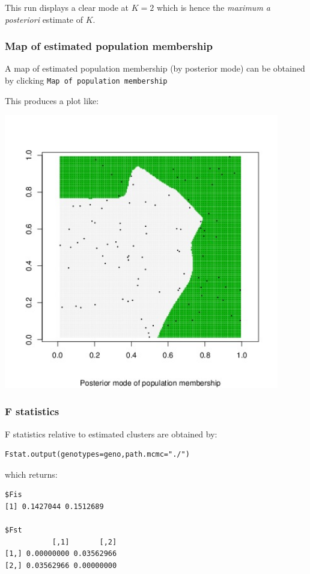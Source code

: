 \documentclass{article}
\begin{document}
This run displays a clear mode at $K=2$ which is hence the {\em maximum a posteriori} estimate of $K$.

\clearpage
\subsubsection{Map of estimated  population membership}
A map of estimated  population membership (by posterior mode) can be obtained by clicking \texttt{Map of population membership}


This produces a plot like:\\


\centerline{\includegraphics[width=12cm]{../inst/images/map.jpeg}}


\subsubsection{F statistics}
F statistics \cite{Weir84} relative to estimated clusters are obtained by:

\begin{verbatim}
Fstat.output(genotypes=geno,path.mcmc="./")
\end{verbatim}

which returns:

\begin{verbatim}
$Fis
[1] 0.1427044 0.1512689

$Fst
           [,1]       [,2]
[1,] 0.00000000 0.03562966
[2,] 0.03562966 0.00000000
\end{verbatim}
\end{document}
